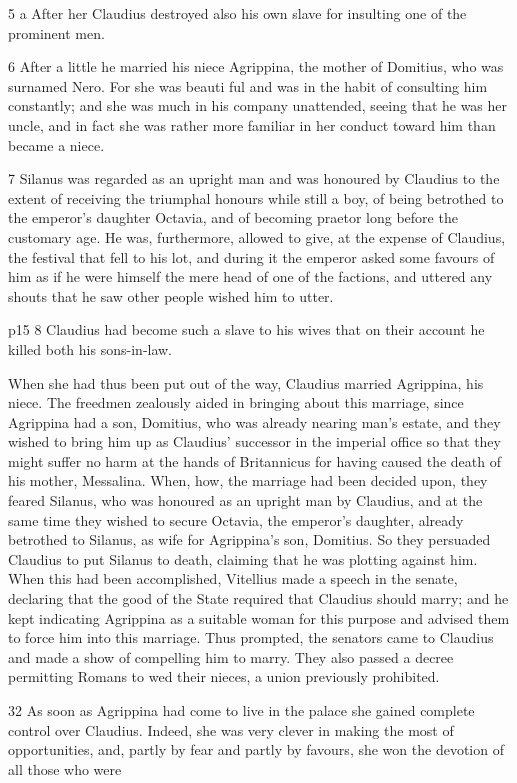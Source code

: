 5 a
After her Claudius destroyed also his own slave for insulting one of the prominent men.

6
After a little he married his niece Agrippina, the mother of Domitius, who was surnamed Nero. For she was beauti ­ful and was in the habit of consulting him constantly; and she was much in his company unattended, seeing that he was her uncle, and in fact she was rather more familiar in her conduct toward him than became a niece.

7
Silanus was regarded as an upright man and was honoured by Claudius to the extent of receiving the triumphal honours while still a boy, of being betrothed to the emperor's daughter Octavia, and of becoming praetor long before the customary age. He was, furthermore, allowed to give, at the expense of Claudius, the festival that fell to his lot, and during it the emperor asked some favours of him as if he were himself the mere head of one of the factions, and uttered any shouts that he saw other people wished him to utter.

p15
8
Claudius had become such a slave to his wives that on their account he killed both his sons-in\texthebrew{‑}law.

When she had thus been put out of the way, Claudius married Agrippina, his niece. The freedmen zealously aided in bringing about this marriage, since Agrippina had a son, Domitius, who was already nearing man's estate, and they wished to bring him up as Claudius' successor in the imperial office so that they might suffer no harm at the hands of Britannicus for having caused the death of his mother, Messalina. When, how, the marriage had been decided upon, they feared Silanus, who was honoured as an upright man by Claudius, and at the same time they wished to secure Octavia, the emperor's daughter, already betrothed to Silanus, as wife for Agrippina's son, Domitius. So they persuaded Claudius to put Silanus to death, claiming that he was plotting against him. When this had been accomplished, Vitellius made a speech in the senate, declaring that the good of the State required that Claudius should marry; and he kept indicating Agrippina as a suitable woman for this purpose and advised them to force him into this marriage. Thus prompted, the senators came to Claudius and made a show of compelling him to marry. They also passed a decree permitting Romans to wed their nieces, a union previously prohibited.

32
As soon as Agrippina had come to live in the palace she gained complete control over Claudius. Indeed, she was very clever in making the most of opportunities, and, partly by fear and partly by favours, she won the devotion of all those who were

